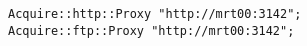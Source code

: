 \begin{lstlisting}[style=Bash]
Acquire::http::Proxy "http://mrt00:3142";
Acquire::ftp::Proxy "http://mrt00:3142";
\end{lstlisting}